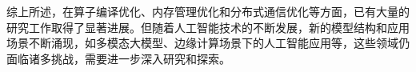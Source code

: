 综上所述，在算子编译优化、内存管理优化和分布式通信优化等方面，已有大量的研究工作取得了显著进展。但随着人工智能技术的不断发展，新的模型结构和应用场景不断涌现，如多模态大模型、边缘计算场景下的人工智能应用等，这些领域仍面临诸多挑战，需要进一步深入研究和探索。













